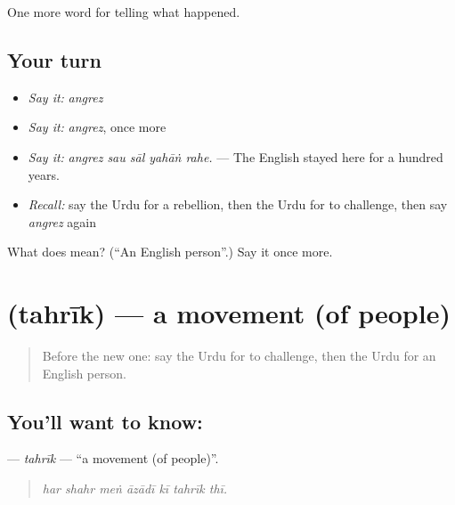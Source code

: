 \begin{grammarlens}[title={What you've built}]
One more word for telling what happened.
\end{grammarlens}

\subsection*{Your turn}
\begin{itemize}
\raggedright
  \item \emph{Say it:} \emph{angrez}
  \item \emph{Say it:} \emph{angrez}, once more
  \item \emph{Say it:} \emph{angrez sau sāl yahāṅ rahe.} — The English stayed here for a hundred years.
  \item \emph{Recall:} say the Urdu for a rebellion, then the Urdu for to challenge, then say \emph{angrez} again
\end{itemize}

\begin{tcolorbox}[breakable,colback=teal!4,colframe=teal!35!black,title={Before you move on}]
What does  mean? (\textquotedblleft{}An English person\textquotedblright{}.) Say it once more.
\end{tcolorbox}
\section[\texorpdfstring{\ur{تحریک} (tahrīk)}{تحریک (tahrīk)}]{ (tahrīk) — a movement (of people)}

\label{lesson:UR-C313-tahrik}



\begin{quote}
Before the new one: say the Urdu for to challenge, then the Urdu for an English person.
\end{quote}

\subsection*{You'll want to know: }
\textbf{} — \emph{tahrīk} — \textquotedblleft{}a movement (of people)\textquotedblright{}.

\begin{quote}
      
\end{quote}

\begin{quote}
\emph{har shahr meṅ āzādī kī tahrīk thī.}
\end{quote}

